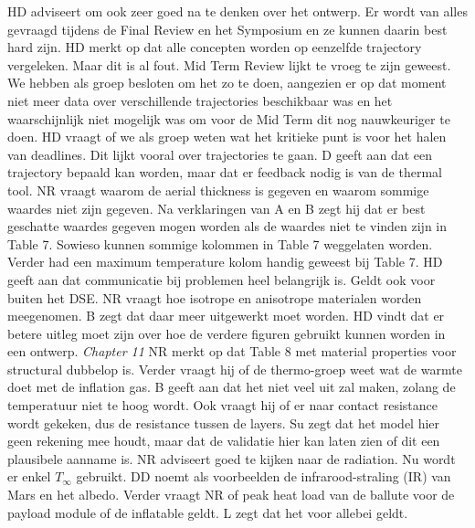 \newline
HD adviseert om ook zeer goed na te denken over het ontwerp. Er wordt van alles gevraagd tijdens de Final Review en het Symposium en ze kunnen daarin best hard zijn.
\newline
HD merkt op dat alle concepten worden op eenzelfde trajectory vergeleken. Maar dit is al fout. Mid Term Review lijkt te vroeg te zijn geweest. We hebben als groep besloten om het zo te doen, aangezien er op dat moment niet meer data over verschillende trajectories beschikbaar was en het waarschijnlijk niet mogelijk was om voor de Mid Term dit nog nauwkeuriger te doen. HD vraagt of we als groep weten wat het kritieke punt is voor het halen van deadlines. Dit lijkt vooral over trajectories te gaan. D geeft aan dat een trajectory bepaald kan worden, maar dat er feedback nodig is van de thermal tool.
\newline
NR vraagt waarom de aerial thickness is gegeven en waarom sommige waardes niet zijn gegeven. Na verklaringen van A en B zegt hij dat er best geschatte waardes gegeven mogen worden als de waardes niet te vinden zijn in Table 7. Sowieso kunnen sommige kolommen in Table 7 weggelaten worden. Verder had een maximum temperature kolom handig geweest bij Table 7.
\newline
HD geeft aan dat communicatie bij problemen heel belangrijk is. Geldt ook voor buiten het DSE.
\newline
NR vraagt hoe isotrope en anisotrope materialen worden meegenomen. B zegt dat daar meer uitgewerkt moet worden. HD vindt dat er betere uitleg moet zijn over hoe de verdere figuren gebruikt kunnen worden in een ontwerp.
\newline\newline
\textit{Chapter 11}\newline
NR merkt op dat Table 8 met material properties voor structural dubbelop is. Verder vraagt hij of de thermo-groep weet wat de warmte doet met de inflation gas. B geeft aan dat het niet veel uit zal maken, zolang de temperatuur niet te hoog wordt. Ook vraagt hij of er naar contact resistance wordt gekeken, dus de resistance tussen de layers. Su zegt dat het model hier geen rekening mee houdt, maar dat de validatie hier kan laten zien of dit een plausibele aanname is.
\newline
NR adviseert goed te kijken naar de radiation. Nu wordt er enkel $T_\infty$ gebruikt. DD noemt als voorbeelden de infrarood-straling (IR) van Mars en het albedo. Verder vraagt NR of peak heat load van de ballute voor de payload module of de inflatable geldt. L zegt dat het voor allebei geldt.
